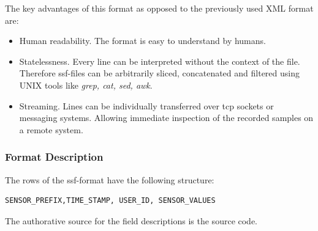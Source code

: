 The key advantages of this format as opposed to the previously used
XML format are:
\begin{itemize}
\item Human readability. The format is easy to understand by humans.
\item Statelessness. Every line can be interpreted without the context
  of the file. Therefore ssf-files can be arbitrarily sliced,
  concatenated and filtered using UNIX tools like {\it grep, cat, sed,
    awk}.
\item Streaming. Lines can be individually transferred over tcp
  sockets or messaging systems. Allowing immediate inspection of the
  recorded samples on a remote system.
\end{itemize}

\subsubsection*{Format Description}

The rows of the ssf-format have the following structure:
\small
\begin{verbatim}
SENSOR_PREFIX,TIME_STAMP, USER_ID, SENSOR_VALUES
\end{verbatim}
\normalsize


The authorative source for the field descriptions is the source code.

